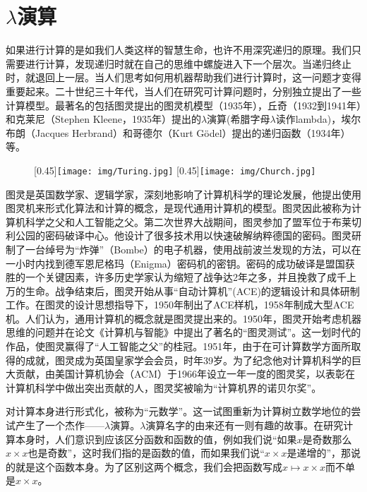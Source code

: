 \documentclass[UTF8]{article}
\begin{document}
\section{$\lambda$演算}

如果进行计算的是如我们人类这样的智慧生命，也许不用深究递归的原理。我们只需要进行计算，发现递归时就在自己的思维中螺旋进入下一个层次。当递归终止时，就退回上一层。当人们思考如何用机器帮助我们进行计算时，这一问题才变得重要起来。二十世纪三十年代，当人们在研究可计算问题时，分别独立提出了一些计算模型。最著名的包括图灵提出的图灵机模型（1935年），丘奇（1932到1941年）和克莱尼（Stephen Kleene，1935年）提出的$\lambda$演算(希腊字母$\lambda$读作lambda)，埃尔布朗（Jacques Herbrand）和哥德尔（Kurt Gödel）提出的递归函数（1934年）等。

\begin{figure}[htbp]
 \centering
 [0.45\linewidth]{\texttt{[image: img/Turing.jpg]}} \quad
 [0.45\linewidth]{\texttt{[image: img/Church.jpg]}}
 \captionsetup{labelformat=empty}
 \label{fig:Turing}
 \label{fig:Church}
\end{figure}

图灵是英国数学家、逻辑学家，深刻地影响了计算机科学的理论发展，他提出使用图灵机来形式化算法和计算的概念，是现代通用计算机的模型。图灵因此被称为计算机科学之父和人工智能之父\cite{wiki-Turing}。第二次世界大战期间，图灵参加了盟军位于布莱切利公园的密码破译中心。他设计了很多技术用以快速破解纳粹德国的密码。图灵研制了一台绰号为“炸弹”（Bombe）的电子机器，使用战前波兰发现的方法，可以在一小时内找到德军恩尼格玛（Enigma）密码机的密钥。密码的成功破译是盟国获胜的一个关键因素，许多历史学家认为缩短了战争达2年之多，并且挽救了成千上万的生命。战争结束后，图灵开始从事“自动计算机”(ACE)的逻辑设计和具体研制工作。在图灵的设计思想指导下，1950年制出了ACE样机，1958年制成大型ACE机。人们认为，通用计算机的概念就是图灵提出来的。1950年，图灵开始考虑机器思维的问题并在论文《计算机与智能》中提出了著名的“图灵测试”。这一划时代的作品，使图灵赢得了“人工智能之父”的桂冠。1951年，由于在可计算数学方面所取得的成就，图灵成为英国皇家学会会员，时年39岁。为了纪念他对计算机科学的巨大贡献，由美国计算机协会（ACM）于1966年设立一年一度的图灵奖，以表彰在计算机科学中做出突出贡献的人，图灵奖被喻为“计算机界的诺贝尔奖”。

对计算本身进行形式化，被称为“元数学”。这一试图重新为计算树立数学地位的尝试产生了一个杰作——$\lambda$演算。$\lambda$演算名字的由来还有一则有趣的故事。在研究计算本身时，人们意识到应该区分函数和函数的值，例如我们说“如果$x$是奇数那么$x \times x$也是奇数”，这时我们指的是函数的值，而如果我们说“$x \times x$是递增的”，那说的就是这个函数本身。为了区别这两个概念，我们会把函数写成$x \mapsto x \times x$而不单是$x \times x$。
\end{document}
